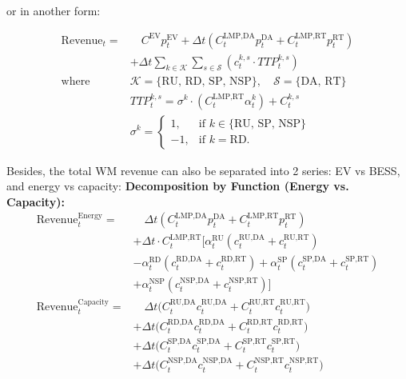 \documentclass[conference]{IEEEtran}
\begin{document}
{or in another form:

\begin{align}
    \text{Revenue}_t = & \quad C^{\text{EV}} p_{t}^{\text{EV}} + \Delta t \left( C_{t}^{\text{LMP,DA}} p_{t}^{\text{DA}} + C_{t}^{\text{LMP,RT}} p_{t}^{\text{RT}} \right) \nonumber \\
    & + \Delta t \sum_{k \in \mathcal{K}} \sum_{s \in \mathcal{S}} \left( c_{t}^{k,s} \cdot TTP_{t}^{k,s} \right) \label{eq:revenue} \\[10pt]
    \text{where} \quad & \mathcal{K} = \{ \text{RU, RD, SP, NSP} \}, \quad \mathcal{S} = \{ \text{DA, RT} \} \nonumber \\
    & TTP_{t}^{k,s} = \sigma^k \cdot (C_{t}^{\text{LMP,RT}} \alpha_{t}^{k}) + C_{t}^{k,s} \nonumber \\
    & \sigma^k = 
    \begin{cases} 
    1, & \text{if } k \in \{ \text{RU, SP, NSP} \} \\
    -1, & \text{if } k = \text{RD}.
    \end{cases} \nonumber
\end{align}

Besides, the total WM revenue can also be separated into 2 series: EV vs BESS, and energy vs capacity:
\noindent \textbf{Decomposition by Function (Energy vs. Capacity):}
\begin{align}
    \text{Revenue}_{t}^{\text{Energy}} = & \quad \Delta t \left( C_{t}^{\text{LMP,DA}} p_{t}^{\text{DA}} + C_{t}^{\text{LMP,RT}} p_{t}^{\text{RT}} \right) \nonumber \\
    & + \Delta t \cdot C_{t}^{\text{LMP,RT}} \Big[ \alpha_{t}^{\text{RU}} (c_{t}^{\text{RU,DA}} + c_{t}^{\text{RU,RT}}) \nonumber \\
    & - \alpha_{t}^{\text{RD}} (c_{t}^{\text{RD,DA}} + c_{t}^{\text{RD,RT}}) 
    + \alpha_{t}^{\text{SP}} (c_{t}^{\text{SP,DA}} + c_{t}^{\text{SP,RT}}) \nonumber \\
    & + \alpha_{t}^{\text{NSP}} (c_{t}^{\text{NSP,DA}} + c_{t}^{\text{NSP,RT}}) \Big] \\
    \text{Revenue}_{t}^{\text{Capacity}} = & \quad \Delta t \Big( C_{t}^{\text{RU,DA}} c_{t}^{\text{RU,DA}} + C_{t}^{\text{RU,RT}} c_{t}^{\text{RU,RT}} \Big) \nonumber \\
    & + \Delta t \Big( C_{t}^{\text{RD,DA}} c_{t}^{\text{RD,DA}} + C_{t}^{\text{RD,RT}} c_{t}^{\text{RD,RT}} \Big) \nonumber \\
    & + \Delta t \Big( C_{t}^{\text{SP,DA}} c_{t}^{\text{SP,DA}} + C_{t}^{\text{SP,RT}} c_{t}^{\text{SP,RT}} \Big) \nonumber \\
    & + \Delta t \Big( C_{t}^{\text{NSP,DA}} c_{t}^{\text{NSP,DA}} + C_{t}^{\text{NSP,RT}} c_{t}^{\text{NSP,RT}} \Big)
\end{align}

}
\end{document}
